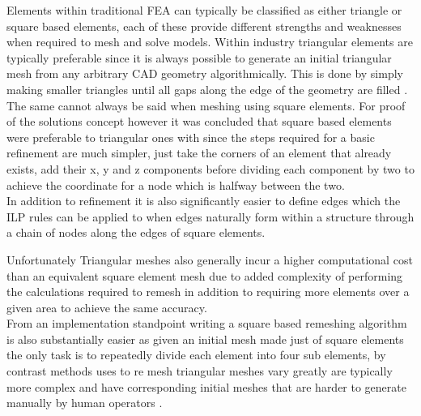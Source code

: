 \noindent
Elements within traditional FEA can typically be classified as either triangle or square based elements, each of these provide different strengths and weaknesses when required to mesh and solve models. Within industry triangular elements are typically preferable since it is always possible to generate an initial triangular mesh from any arbitrary CAD geometry algorithmically. This is done by simply making smaller triangles until all gaps along the edge of the geometry are filled \cite{DelaunyTriangles}. The same cannot always be said  when meshing using square elements. For proof of the solutions concept however it was concluded that square based elements were preferable to triangular ones with since the steps required for a basic refinement are much simpler, just take the corners of an element that already exists, add their x, y and z components before dividing each component by two to achieve the coordinate for a node which is halfway between the two. \\ 

\noindent
In addition to refinement it is also significantly easier to define edges which the ILP rules can be applied to when edges naturally form within a structure through a chain of nodes along the edges of square elements.


\noindent
Unfortunately Triangular meshes also generally incur a higher computational cost than an equivalent square element mesh due to added complexity of performing the calculations required to remesh in addition to requiring more elements over a given area to achieve the same accuracy. \\

\noindent
From an implementation standpoint writing a square based remeshing algorithm is also substantially easier as given an initial mesh made just of square elements the only task is to repeatedly divide each element into four sub elements, by contrast methods uses to re mesh triangular meshes vary greatly are typically more complex and have corresponding initial meshes that are harder to generate manually by human operators \cite{HandMeshing}. \\ 

